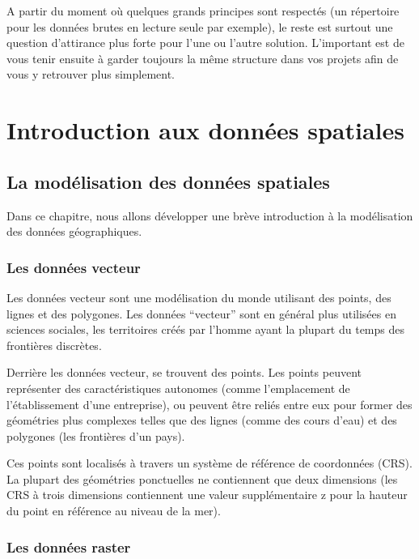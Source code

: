 \documentclass[
]{book}
\begin{document}
A partir du moment où quelques grands principes sont respectés (un répertoire pour les données brutes en lecture seule par exemple), le reste est surtout une question d'attirance plus forte pour l'une ou l'autre solution. L'important est de vous tenir ensuite à garder toujours la même structure dans vos projets afin de vous y retrouver plus simplement.

\hypertarget{part-introduction-aux-donnuxe9es-spatiales}{%
\part{Introduction aux données spatiales}\label{part-introduction-aux-donnuxe9es-spatiales}}

\hypertarget{la-moduxe9lisation-des-donnuxe9es-spatiales}{%
\chapter{La modélisation des données spatiales}\label{la-moduxe9lisation-des-donnuxe9es-spatiales}}

Dans ce chapitre, nous allons développer une brève introduction à la modélisation des données géographiques.

\hypertarget{les-donnuxe9es-vecteur}{%
\section{Les données vecteur}\label{les-donnuxe9es-vecteur}}

Les données vecteur sont une modélisation du monde utilisant des points, des lignes et des polygones.
Les données ``vecteur'' sont en général plus utilisées en sciences sociales, les territoires créés par l'homme ayant la plupart du temps des frontières discrètes.

Derrière les données vecteur, se trouvent des points. Les points peuvent représenter des caractéristiques autonomes (comme l'emplacement de l'établissement d'une entreprise), ou peuvent être reliés entre eux pour former des géométries plus complexes telles que des lignes (comme des cours d'eau) et des polygones (les frontières d'un pays).

Ces points sont localisés à travers un système de référence de coordonnées (CRS). La plupart des géométries ponctuelles ne contiennent que deux dimensions (les CRS à trois dimensions contiennent une valeur supplémentaire z pour la hauteur du point en référence au niveau de la mer).

\hypertarget{les-donnuxe9es-raster}{%
\section{Les données raster}\label{les-donnuxe9es-raster}}
\end{document}
